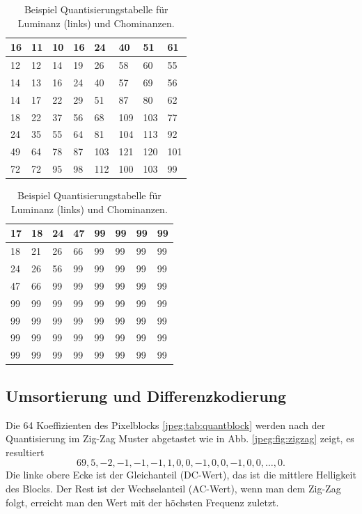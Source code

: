 \begin{table}[b]
    \centering
    \begin{tabularx}{0.47\linewidth}{|X|X|X|X|X|X|X|X|}
        \hline
        16 & 11 & 10 & 16 & 24  & 40 & 51 & 61    \\ \hline
        12 & 12 & 14 & 19 & 26  & 58 & 60 & 55    \\ \hline
        14 & 13 & 16 & 24 & 40  & 57 & 69 & 56    \\ \hline
        14 & 17 & 22 & 29 & 51  & 87 & 80 & 62    \\ \hline
        18 & 22 & 37 & 56 & 68  & 109 & 103 & 77  \\ \hline
        24 & 35 & 55 & 64 & 81  & 104 & 113 & 92  \\ \hline
        49 & 64 & 78 & 87 & 103 & 121 & 120 & 101 \\ \hline
        72 & 72 & 95 & 98 & 112 & 100 & 103 & 99  \\ \hline        
    \end{tabularx}
    \qquad
    \begin{tabularx}{0.47\linewidth}{|X|X|X|X|X|X|X|X|}
        \hline
        17 & 18 & 24 & 47 & 99 & 99 & 99 & 99  \\ \hline
        18 & 21 & 26 & 66 & 99 & 99 & 99 & 99  \\ \hline
        24 & 26 & 56 & 99 & 99 & 99 & 99 & 99  \\ \hline
        47 & 66 & 99 & 99 & 99 & 99 & 99 & 99  \\ \hline
        99 & 99 & 99 & 99 & 99 & 99 & 99 & 99  \\ \hline
        99 & 99 & 99 & 99 & 99 & 99 & 99 & 99  \\ \hline
        99 & 99 & 99 & 99 & 99 & 99 & 99 & 99  \\ \hline
        99 & 99 & 99 & 99 & 99 & 99 & 99 & 99  \\ \hline  	  
    \end{tabularx}
    \caption{Beispiel Quantisierungstabelle für Luminanz (links) und Chominanzen.
        \label{jpeg:tab:quant}}
\end{table}



\subsection{Umsortierung und Differenzkodierung
\label{jpeg:subsection:umsortierung}}
Die 64 Koeffizienten des Pixelblocks \ref{jpeg:tab:quantblock} werden nach der Quantisierung im Zig-Zag Muster abgetastet wie in Abb. \ref{jpeg:fig:zigzag} zeigt, es resultiert
\begin{equation}
    69, 5, -2, -1, -1, -1, 1, 0, 0, -1, 0, 0, -1, 0, 0,\dots, 0.
    \label{jpeg:equation:abgetastet}
\end{equation}
Die linke obere Ecke ist der Gleichanteil (DC-Wert), das ist die mittlere Helligkeit des Blocks.
Der Rest ist der Wechselanteil (AC-Wert), wenn man dem Zig-Zag folgt, erreicht man den Wert mit der höchsten Frequenz zuletzt.

